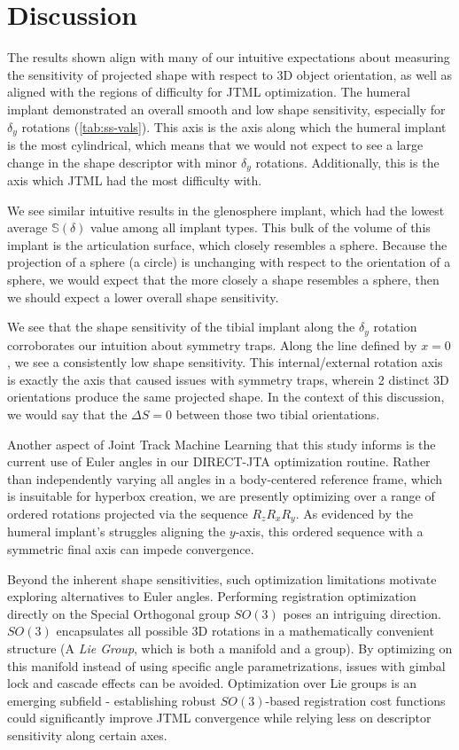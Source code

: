 \section{Discussion}
The results shown align with many of our intuitive expectations about measuring the sensitivity of projected shape with respect to 3D object orientation, as well as aligned with the regions of difficulty for JTML optimization.
The humeral implant demonstrated an overall smooth and low shape sensitivity, especially for $\delta_{y}$ rotations (\cref{tab:ss-vals}).
This axis is the axis along which the humeral implant is the most cylindrical, which means that we would not expect to see a large change in the shape descriptor with minor $\delta_{y}$ rotations.
Additionally, this is the axis which JTML had the most difficulty with.

We see similar intuitive results in the glenosphere implant, which had the lowest average $\mathbb{S}(\delta)$ value among all implant types.
This bulk of the volume of this implant is the articulation surface, which closely resembles a sphere.
Because the projection of a sphere (a circle) is unchanging with respect to the orientation of a sphere, we would expect that the more closely a shape resembles a sphere, then we should expect a lower overall shape sensitivity.

We see that the shape sensitivity of the tibial implant along the $\delta_{y}$ rotation corroborates our intuition about symmetry traps.
Along the line defined by $x=0$, we see a consistently low shape sensitivity.
This internal/external rotation axis is exactly the axis that caused issues with symmetry traps, wherein 2 distinct 3D orientations produce the same projected shape.
In the context of this discussion, we would say that the $\Delta S = 0$ between those two tibial orientations.

Another aspect of Joint Track Machine Learning that this study informs is the current use of Euler angles in our DIRECT-JTA optimization routine.
Rather than independently varying all angles in a body-centered reference frame, which is insuitable for hyperbox creation, we are presently optimizing over a range of ordered rotations projected via the sequence $R_{z}R_{x}R_{y}$.
As evidenced by the humeral implant's struggles aligning the $y$-axis, this ordered sequence with a symmetric final axis can impede convergence.

Beyond the inherent shape sensitivities, such optimization limitations motivate exploring alternatives to Euler angles.
Performing registration optimization directly on the Special Orthogonal group $SO(3)$ poses an intriguing direction.
$SO(3)$ encapsulates all possible 3D rotations in a mathematically convenient structure (A \emph{Lie Group}, which is both a manifold and a group).
By optimizing on this manifold instead of using specific angle parametrizations, issues with gimbal lock and cascade effects can be avoided.
Optimization over Lie groups is an emerging subfield - establishing robust $SO(3)$-based registration cost functions could significantly improve JTML convergence while relying less on descriptor sensitivity along certain axes.


